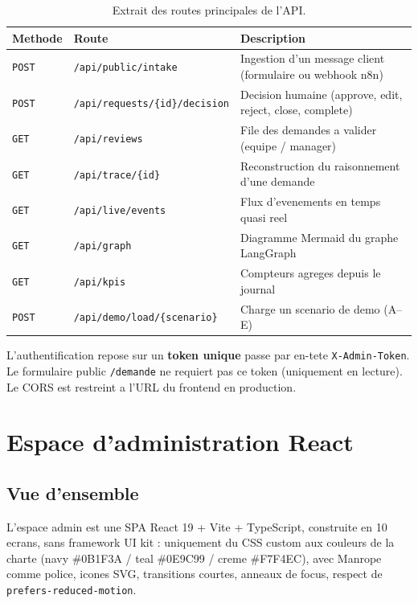 \documentclass[12pt,a4paper,openany]{report}
\begin{document}
\begin{table}[H]\centering\small
\caption{Extrait des routes principales de l'API.}
\label{tab:routes}
\begin{tabularx}{\textwidth}{l l X}\toprule
\rowcolor{boxBlue!30}\textbf{Methode} & \textbf{Route} & \textbf{Description}\\\midrule
\texttt{POST}  & \texttt{/api/public/intake}       & Ingestion d'un message client (formulaire ou webhook n8n)\\
\texttt{POST}  & \texttt{/api/requests/\{id\}/decision} & Decision humaine (approve, edit, reject, close, complete)\\
\texttt{GET}   & \texttt{/api/reviews}             & File des demandes a valider (equipe / manager)\\
\texttt{GET}   & \texttt{/api/trace/\{id\}}        & Reconstruction du raisonnement d'une demande\\
\texttt{GET}   & \texttt{/api/live/events}         & Flux d'evenements en temps quasi reel\\
\texttt{GET}   & \texttt{/api/graph}               & Diagramme Mermaid du graphe LangGraph\\
\texttt{GET}   & \texttt{/api/kpis}                & Compteurs agreges depuis le journal\\
\texttt{POST}  & \texttt{/api/demo/load/\{scenario\}} & Charge un scenario de demo (A--E)\\
\bottomrule
\end{tabularx}
\end{table}

L'authentification repose sur un \textbf{token unique} passe par en-tete \texttt{X-Admin-Token}. Le formulaire public \texttt{/demande} ne requiert pas ce token (uniquement en lecture). Le CORS est restreint a l'URL du frontend en production.

\section{Espace d'administration React}

\subsection{Vue d'ensemble}
L'espace admin est une SPA React 19 + Vite + TypeScript, construite en 10 ecrans, sans framework UI kit : uniquement du CSS custom aux couleurs de la charte (navy \#0B1F3A / teal \#0E9C99 / creme \#F7F4EC), avec Manrope comme police, icones SVG, transitions courtes, anneaux de focus, respect de \texttt{prefers-reduced-motion}.
\end{document}
